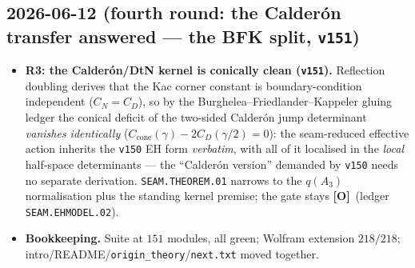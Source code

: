 \documentclass[11pt]{article}
\providecommand{\mO}{\textbf{[O]}}\providecommand{\mX}{\textbf{[X]}}
\providecommand{\vref}[1]{\texttt{#1}}
\begin{document}
\subsection*{2026-06-12 (fourth round: the Calder\'on transfer answered --- the BFK split, \vref{v151})}
\begin{itemize}
\item \textbf{R3: the Calder\'on/DtN kernel is conically clean (\vref{v151}).} Reflection
  doubling derives that the Kac corner constant is boundary-condition independent
  ($C_N=C_D$), so by the Burghelea--Friedlander--Kappeler gluing ledger the conical
  deficit of the two-sided Calder\'on jump determinant \emph{vanishes identically}
  ($C_{\mathrm{cone}}(\gamma)-2C_D(\gamma/2)=0$): the seam-reduced effective action
  inherits the \vref{v150} EH form \emph{verbatim}, with all of it localised in the
  \emph{local} half-space determinants --- the ``Calder\'on version'' demanded by
  \vref{v150} needs no separate derivation. \texttt{SEAM.THEOREM.01} narrows to the
  $q(A_3)$ normalisation plus the standing kernel premise; the gate stays \mO\ (ledger
  \texttt{SEAM.EHMODEL.02}).
\item \textbf{Bookkeeping.} Suite at $151$ modules, all green; Wolfram extension
  $218/218$; intro/README/\texttt{origin\_theory}/\texttt{next.txt} moved together.
\end{itemize}
\end{document}
